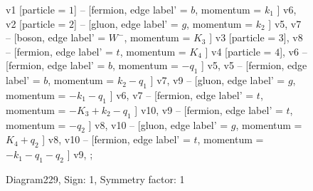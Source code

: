 \documentclass{revtex4}
\begin{document}
\begin{figure}[!htb]
\begin{center}
{    %
v1 [particle = \(1\)] -- [fermion, edge label' = \(b\), momentum = \(k_{1}\) ] v6, 
v2 [particle = \(2\)] -- [gluon, edge label' = \(g\), momentum = \(k_{2}\) ] v5, 
v7 -- [boson, edge label' = \(W^{-}\), momentum = \(K_{3}\) ] v3 [particle = \(3\)], 
v8 -- [fermion, edge label' = \(t\), momentum = \(K_{4}\) ] v4 [particle = \(4\)], 
v6 -- [fermion, edge label' = \(b\), momentum = \(-q_{1}\) ] v5, 
v5 -- [fermion, edge label' = \(b\), momentum = \(k_{2} - q_{1}\) ] v7, 
v9 -- [gluon, edge label' = \(g\), momentum = \(-k_{1} - q_{1}\) ] v6, 
v7 -- [fermion, edge label' = \(t\), momentum = \(-K_{3} + k_{2} - q_{1}\) ] v10, 
v9 -- [fermion, edge label' = \(t\), momentum = \(-q_{2}\) ] v8, 
v10 -- [gluon, edge label' = \(g\), momentum = \(K_{4} + q_{2}\) ] v8, 
v10 -- [fermion, edge label' = \(t\), momentum = \(-k_{1} - q_{1} - q_{2}\) ] v9, 
};
\end{center}
\caption{Diagram229, Sign: 1, Symmetry factor: 1}
\end{figure}
\newpage
\end{document}
